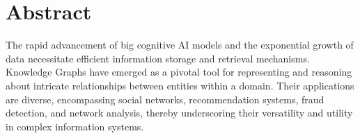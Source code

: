 \thispagestyle{empty}

\chapter*{Abstract}

\justify
\skipspace
The rapid advancement of big cognitive AI models and the exponential growth of
data necessitate efficient information storage and retrieval mechanisms.
Knowledge Graphs have emerged as a pivotal tool for representing and reasoning
about intricate relationships between entities within a domain. Their
applications are diverse, encompassing social networks, recommendation systems,
fraud detection, and network analysis, thereby underscoring their versatility
and utility in complex information systems.

\newpage
